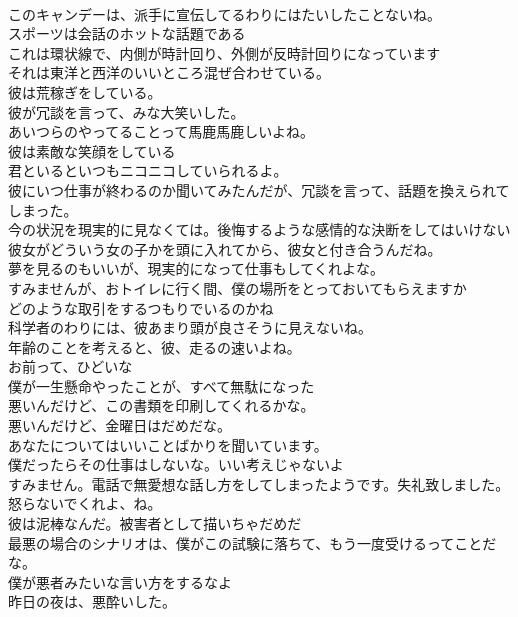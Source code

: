 \documentclass[8pt]{extreport}
\begin{document}
\begin{CJK}{UTF8}{min}
\\	このキャンデーは、派手に宣伝してるわりにはたいしたことないね。	
\\	スポーツは会話のホットな話題である	
\\	これは環状線で、内側が時計回り、外側が反時計回りになっています	
\\	それは東洋と西洋のいいところ混ぜ合わせている。	
\\	彼は荒稼ぎをしている。	
\\	彼が冗談を言って、みな大笑いした。	
\\	あいつらのやってることって馬鹿馬鹿しいよね。	
\\	彼は素敵な笑顔をしている	
\\	君といるといつもニコニコしていられるよ。	
\\	彼にいつ仕事が終わるのか聞いてみたんだが、冗談を言って、話題を換えられてしまった。	
\\	今の状況を現実的に見なくては。後悔するような感情的な決断をしてはいけない	
\\	彼女がどういう女の子かを頭に入れてから、彼女と付き合うんだね。	
\\	夢を見るのもいいが、現実的になって仕事もしてくれよな。	
\\	すみませんが、おトイレに行く間、僕の場所をとっておいてもらえますか	
\\	どのような取引をするつもりでいるのかね	
\\	科学者のわりには、彼あまり頭が良さそうに見えないね。	
\\	年齢のことを考えると、彼、走るの速いよね。	
\\	お前って、ひどいな	
\\	僕が一生懸命やったことが、すべて無駄になった	
\\	悪いんだけど、この書類を印刷してくれるかな。	
\\	悪いんだけど、金曜日はだめだな。	
\\	あなたについてはいいことばかりを聞いています。	
\\	僕だったらその仕事はしないな。いい考えじゃないよ	
\\	すみません。電話で無愛想な話し方をしてしまったようです。失礼致しました。	
\\	怒らないでくれよ、ね。	
\\	彼は泥棒なんだ。被害者として描いちゃだめだ	
\\	最悪の場合のシナリオは、僕がこの試験に落ちて、もう一度受けるってことだな。	
\\	僕が悪者みたいな言い方をするなよ	
\\	昨日の夜は、悪酔いした。	

\end{CJK}
\end{document}
